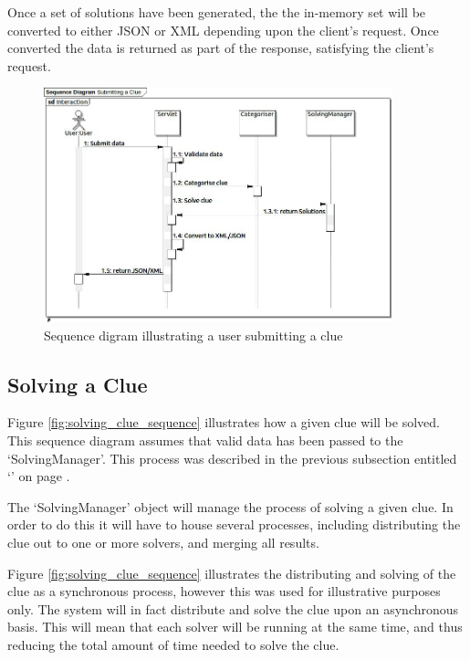 Once a set of solutions have been generated, the the in-memory set will be 
converted to either JSON or XML depending upon the client's request. Once 
converted the data is returned as part of the response, satisfying the client's
request.

\begin{figure}[H]
  \centering
  \includegraphics[width=0.9\textwidth]{design/sequence/submitting_a_clue.jpg}
  \caption{Sequence digram illustrating a user submitting a clue}
  \label{fig:submit_clue_sequence}
\end{figure}


\subsection{Solving a Clue}
\label{sub:solving_a_clue}

Figure \ref{fig:solving_clue_sequence} illustrates how a given clue will be 
solved. This sequence diagram assumes that valid data has been passed to the 
`SolvingManager'. This process was described in the previous subsection entitled
`' on page \pageref{sub:submitting_a_clue}.

The `SolvingManager' object will manage the process of solving a given clue. In 
order to do this it will have to house several processes, including distributing
the clue out to one or more solvers, and merging all results.

Figure \ref{fig:solving_clue_sequence} illustrates the distributing and solving
of the clue as a synchronous process, however this was used for illustrative
purposes only. The system will in fact distribute and solve the clue upon an
asynchronous basis. This will mean that each solver will be running at the same 
time, and thus reducing the total amount of time needed to solve the clue.

